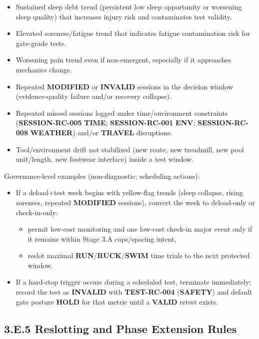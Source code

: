 \documentclass[10pt]{article}
\begin{document}
\begin{itemize}
\item Sustained sleep debt trend (persistent low sleep opportunity or worsening sleep quality) that increases injury risk and contaminates test validity.
\item Elevated soreness/fatigue trend that indicates fatigue contamination risk for gate-grade tests.
\item Worsening pain trend even if non-emergent, especially if it approaches mechanics change.
\item Repeated \textbf{MODIFIED} or \textbf{INVALID} sessions in the decision window (evidence-quality failure and/or recovery collapse).
\item Repeated missed sessions logged under time/environment constraints (\textbf{SESSION-RC-005} \textbf{TIME}; \textbf{SESSION-RC-001} \textbf{ENV}; \textbf{SESSION-RC-008} \textbf{WEATHER}) and/or \textbf{TRAVEL} disruptions.
\item Tool/environment drift not stabilized (new route, new treadmill, new pool unit/length, new footwear interface) inside a test window.
\end{itemize}

Governance-level examples (non-diagnostic; scheduling actions):

\begin{itemize}
\item If a deload+test week begins with yellow-flag trends (sleep collapse, rising soreness, repeated \textbf{MODIFIED} sessions), convert the week to deload-only or check-in-only:
\begin{itemize}
\item permit low-cost monitoring and one low-cost check-in major event only if it remains within Stage 3.A caps/spacing intent,
\item reslot maximal \textbf{RUN}/\textbf{RUCK}/\textbf{SWIM} time trials to the next protected window.
\end{itemize}
\item If a hard-stop trigger occurs during a scheduled test, terminate immediately; record the test as \textbf{INVALID} with \textbf{TEST-RC-004} (\textbf{SAFETY}) and default gate posture \textbf{HOLD} for that metric until a \textbf{VALID} retest exists.
\end{itemize}

\subsection*{3.E.5 Reslotting and Phase Extension Rules}
{}
\end{document}
